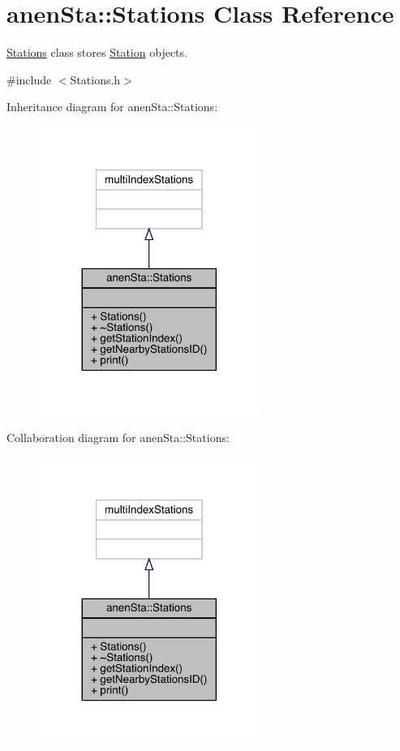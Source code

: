 \hypertarget{classanen_sta_1_1_stations}{}\section{anen\+Sta\+:\+:Stations Class Reference}
\label{classanen_sta_1_1_stations}


\mbox{\hyperlink{classanen_sta_1_1_stations}{Stations}} class stores \mbox{\hyperlink{classanen_sta_1_1_station}{Station}} objects.  




{\ttfamily \#include $<$Stations.\+h$>$}



Inheritance diagram for anen\+Sta\+:\+:Stations\+:\nopagebreak
\begin{figure}[H]
\begin{center}
\leavevmode
\includegraphics[width=204pt]{classanen_sta_1_1_stations__inherit__graph}
\end{center}
\end{figure}


Collaboration diagram for anen\+Sta\+:\+:Stations\+:\nopagebreak
\begin{figure}[H]
\begin{center}
\leavevmode
\includegraphics[width=204pt]{classanen_sta_1_1_stations__coll__graph}
\end{center}
\end{figure}
